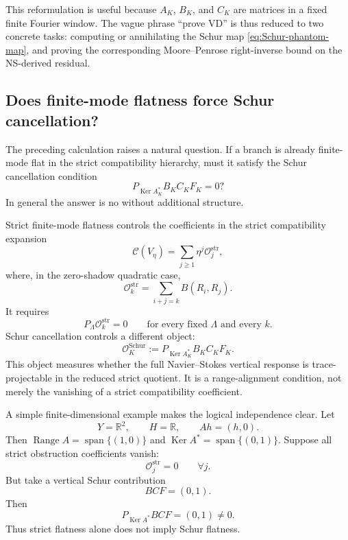 \documentclass[11pt]{article}
\numberwithin{equation}{section}
\DeclareMathOperator{\Range}{Range}
\DeclareMathOperator{\Ker}{Ker}
\newcommand{\R}{\mathbb R}
\newcommand{\str}{\mathrm{str}}
\newcommand{\calC}{\mathcal C}
\newcommand{\calO}{\mathcal O}
\begin{document}
This reformulation is useful because \(A_K\), \(B_K\), and \(C_K\) are matrices in a fixed finite Fourier window.  The vague phrase ``prove VD'' is thus reduced to two concrete tasks: computing or annihilating the Schur map \eqref{eq:Schur-phantom-map}, and proving the corresponding Moore--Penrose right-inverse bound on the NS-derived residual.

\subsection{Does finite-mode flatness force Schur cancellation?}\label{subsec:flatness-vs-schur}

The preceding calculation raises a natural question.  If a branch is already finite-mode flat in the strict compatibility hierarchy, must it satisfy the Schur cancellation condition
\[
        P_{\Ker A_K^*}B_KC_KF_K=0?
\]
In general the answer is no without additional structure.

Strict finite-mode flatness controls the coefficients in the strict compatibility expansion
\[
        \calC(V_\eta)
        =\sum_{j\ge1}\eta^j\calO_j^{\str},
\]
where, in the zero-shadow quadratic case,
\begin{equation}\label{eq:strict-obstruction-coefficients}
        \calO_k^{\str}
        =\sum_{i+j=k}B(R_i,R_j).
\end{equation}
It requires
\[
        P_\Lambda\calO_k^{\str}=0
        \qquad \text{for every fixed }\Lambda\text{ and every }k.
\]
Schur cancellation controls a different object:
\begin{equation}\label{eq:Schur-obstruction-coeff}
        \calO_K^{\mathrm{Schur}}
        :=P_{\Ker A_K^*}B_KC_KF_K.
\end{equation}
This object measures whether the full Navier--Stokes vertical response is trace-projectable in the reduced strict quotient.  It is a range-alignment condition, not merely the vanishing of a strict compatibility coefficient.

A simple finite-dimensional example makes the logical independence clear.  Let
\[
        Y=\R^2,
        \qquad H=\R,
        \qquad Ah=(h,0).
\]
Then \(\Range A=\operatorname{span}\{(1,0)\}\) and \(\Ker A^*=\operatorname{span}\{(0,1)\}\).  Suppose all strict obstruction coefficients vanish:
\[
        \calO_j^{\str}=0
        \qquad \forall j.
\]
But take a vertical Schur contribution
\[
        BCF=(0,1).
\]
Then
\[
        P_{\Ker A^*}BCF=(0,1)\ne0.
\]
Thus strict flatness alone does not imply Schur flatness.
\end{document}
